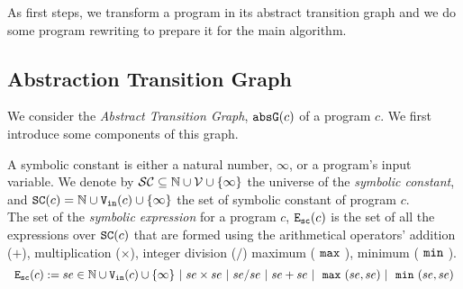 As first steps, we transform a program in its abstract transition graph and we do some program rewriting to prepare it for the main algorithm.

\subsection{Abstraction Transition Graph}
We consider the \emph{Abstract Transition Graph}, $\mathtt{abs}{\mathtt{G}}(c)$
of a program $c$.
We first introduce some components of this graph.
\begin{defn}
 \label{def:symbolic_expr}
A symbolic constant is either a natural number, $\infty$, or a program's input variable. We denote by $\mathcal{SC} \subseteq \mathbb{N} \cup \mathcal{V} \cup \{\infty \}$ the universe of the \emph{symbolic constant},
and $ \mathtt{SC}(c) = \mathbb{N} \cup {\ensuremath{\mathtt{V_{\mathtt{in}}}}}(c) \cup \{\infty \}$ the set of symbolic constant of
program $c$.\\
 The set of the \emph{symbolic expression} for a program $c$,
${\mathtt{E_{sc}}}(c)$ is the set of all the expressions over $\mathtt{SC}(c)$ that are
formed using the arithmetical operators' addition ($+$), multiplication
($\times $),  integer division ($/$) maximum ($~\mathtt{max}~ $), minimum ($~\mathtt{min}~$).
\[
  \begin{array}{rl}
  {\ensuremath{\mathtt{E_{sc}}}}(c) := se \in \mathbb{N} \cup {\ensuremath{\mathtt{V_{\mathtt{in}}}}}(c) \cup \{\infty \} ~|~ se \times se ~|~ se / se ~|~
  se + se ~|~ ~\mathtt{max}~(se, se) ~|~ ~\mathtt{min}~(se, se)
  \end{array}
\]
\end{defn}
